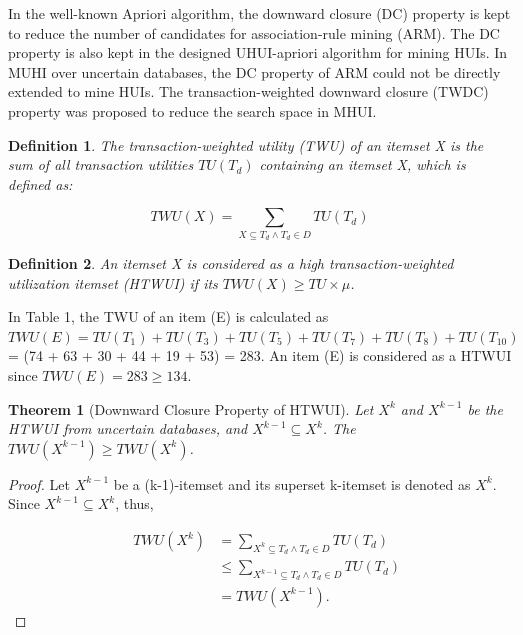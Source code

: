 \documentclass[conference]{IEEEtran}
\newtheorem{IEEEdef}{Definition}
\newtheorem{IEEEthe}{Theorem}
\begin{document}
In the well-known Apriori algorithm, the downward closure (DC) property is kept to reduce the number of candidates for association-rule mining (ARM). The DC property is also kept in the designed UHUI-apriori algorithm for mining HUIs. In MUHI over uncertain databases, the DC property of ARM could not be directly extended to mine HUIs. The transaction-weighted downward closure (TWDC) property was proposed to reduce the search space in MHUI.

\begin{IEEEdef}
\label{def:TWU}
The transaction-weighted utility (TWU) of an itemset X is the sum of all transaction utilities $TU(T_d)$ containing an itemset X, which is defined as:
\end{IEEEdef}

\vspace{-0.4cm}
\begin{equation}
\label{def:TWU}
TWU(X)
= \sum_{X \subseteq T_d \wedge T_d \in D}
TU(T_d)
\end{equation}
\vspace{-0.4cm}

\begin{IEEEdef}
\label{def:HTWUI}
An itemset X is considered as a high transaction-weighted utilization itemset (HTWUI) if its $TWU(X) \geq TU \times \mu$.
\end{IEEEdef}

In Table 1, the TWU of an item (E) is calculated as $TWU(E) = TU(T_1) + TU(T_3) + TU(T_5) + TU(T_7) + TU(T_8) + TU(T_{10})$ = (74 + 63 + 30 + 44 + 19 + 53) = 283. An item (E) is considered as a HTWUI since $TWU(E) = 283 \geq 134$.

\begin{IEEEthe}[Downward Closure Property of HTWUI]
\label{the:DC}
Let $X^k$ and $X^{k-1}$ be the HTWUI from uncertain databases, and $X^{k-1} \subseteq X^k$. The $TWU(X^{k-1}) \geq TWU(X^k)$.
\end{IEEEthe}

\begin{proof}
\label{pro:DC}
Let $X^{k-1}$ be a (k-1)-itemset and its superset k-itemset is denoted as $X^k$. Since $X^{k-1} \subseteq X^k$, thus,

\vspace{-0.7cm}
{\setlength\arraycolsep{1pt}
\small
\begin{eqnarray}
\label{eq:DC}
\ & TWU(X^k) & = \sum_{X^k\subseteq T_d\wedge T_d\in D}TU(T_d) {}
\nonumber \\
&&{} \leq \sum_{X^{k-1}\subseteq T_d\wedge T_d\in D}TU(T_d) {}
\nonumber \\
&&{} = TWU(X^{k-1}).
\end{eqnarray}}
\vspace{-1.2cm}

\end{proof}
\end{document}
